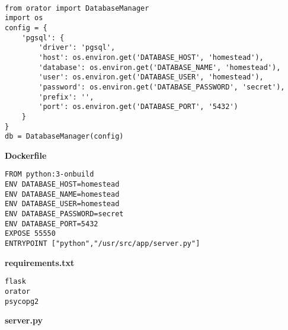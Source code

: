 \begin{mdframed}[linecolor=black, topline=true, bottomline=true,
  leftline=false, rightline=false, backgroundcolor=LightGray,userdefinedwidth=\textwidth]
  \begin{verbatim}

from orator import DatabaseManager
import os
config = {
    'pgsql': {
        'driver': 'pgsql',
        'host': os.environ.get('DATABASE_HOST', 'homestead'),
        'database': os.environ.get('DATABASE_NAME', 'homestead'),
        'user': os.environ.get('DATABASE_USER', 'homestead'),
        'password': os.environ.get('DATABASE_PASSWORD', 'secret'),
        'prefix': '',
        'port': os.environ.get('DATABASE_PORT', '5432')
    }
}
db = DatabaseManager(config)

\end{verbatim}
\end{mdframed}
\vspace{0.2cm}
{ \sffamily 
\textbf{Dockerfile}
}\vspace{0.1cm}


\begin{mdframed}[linecolor=black, topline=true, bottomline=true,
  leftline=false, rightline=false, backgroundcolor=LightGray,userdefinedwidth=\textwidth]
  \begin{verbatim}
FROM python:3-onbuild
ENV DATABASE_HOST=homestead
ENV DATABASE_NAME=homestead
ENV DATABASE_USER=homestead
ENV DATABASE_PASSWORD=secret
ENV DATABASE_PORT=5432
EXPOSE 55550
ENTRYPOINT ["python","/usr/src/app/server.py"]
\end{verbatim}
\end{mdframed}

{ \sffamily 
\textbf{requirements.txt}
}
\begin{mdframed}[linecolor=black, topline=true, bottomline=true,
  leftline=false, rightline=false, backgroundcolor=LightGray,userdefinedwidth=\textwidth]
  \begin{verbatim}
flask
orator
psycopg2
\end{verbatim}
\end{mdframed}

\pagebreak
{ \sffamily \textbf{server.py} }


